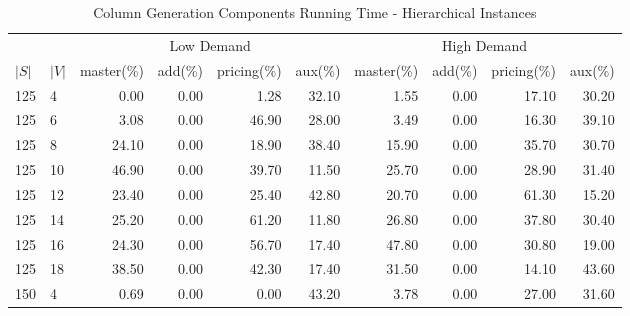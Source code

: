 \begin{table*}[h]
\begin{center}
\caption{Column Generation Components Running Time - Hierarchical Instances}\label{tab:comphier}
\footnotesize
\begin{tabular} {l l | r r r r | r r r r }
\hline
     &                 &  \multicolumn{4}{c|}{Low Demand}                            & \multicolumn{4}{c}{High Demand} \\
$|S|$&           $|V|$ &  master(\%) &  add(\%)      &   pricing(\%)            &  aux(\%)     & master(\%) &            add(\%)       &             pricing(\%)  &  aux(\%) \\
\hline
125  &             4   &  0.00   &            0.00             &               1.28   &  32.10  &  1.55   &            0.00             &               17.10  &  30.20  \\
125  &             6   &  3.08   &            0.00             &               46.90  &  28.00  &  3.49   &            0.00             &               16.30  &  39.10  \\
125  &             8   &  24.10  &            0.00             &               18.90  &  38.40  &  15.90  &            0.00             &               35.70  &  30.70  \\
125  &             10  &  46.90  &            0.00             &               39.70  &  11.50  &  25.70  &            0.00             &               28.90  &  31.40  \\
125  &             12  &  23.40  &            0.00             &               25.40  &  42.80  &  20.70  &            0.00             &               61.30  &  15.20  \\
125  &             14  &  25.20  &            0.00             &               61.20  &  11.80  &  26.80  &            0.00             &               37.80  &  30.40  \\
125  &             16  &  24.30  &            0.00             &               56.70  &  17.40  &  47.80  &            0.00             &               30.80  &  19.00  \\
125  &             18  &  38.50  &            0.00             &               42.30  &  17.40  &  31.50  &            0.00             &               14.10  &  43.60  \\
150  &             4   &  0.69   &            0.00             &               0.00   &  43.20  &  3.78   &            0.00             &               27.00  &  31.60  \\

\end{tabular}
\end{center}
\end{table*}
